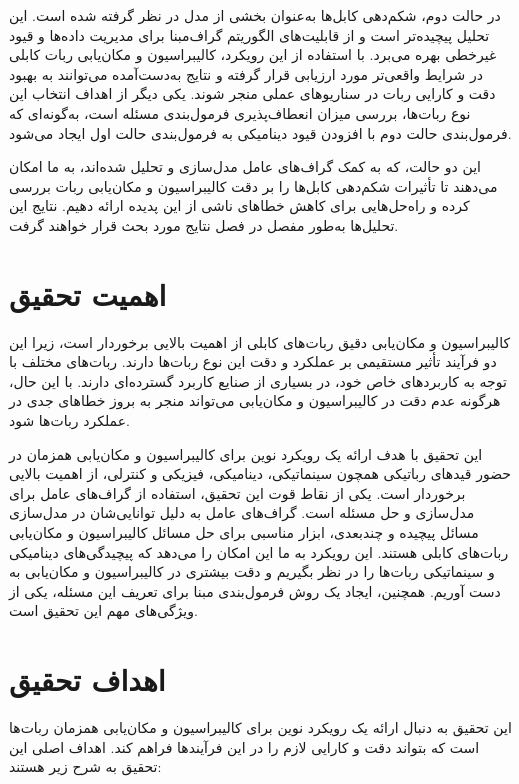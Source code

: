 در حالت دوم، شکم‌دهی کابل‌ها به‌عنوان بخشی از مدل در نظر گرفته شده است. این تحلیل پیچیده‌تر است و از قابلیت‌های الگوریتم گراف‌مبنا برای مدیریت داده‌ها و قیود غیرخطی بهره می‌برد. با استفاده از این رویکرد، کالیبراسیون و مکان‌یابی ربات کابلی در شرایط واقعی‌تر مورد ارزیابی قرار گرفته و نتایج به‌دست‌آمده می‌توانند به بهبود دقت و کارایی ربات در سناریوهای عملی منجر شوند. یکی دیگر از اهداف انتخاب این نوع ربات‌ها، بررسی میزان انعطاف‌پذیری فرمول‌بندی مسئله است، به‌گونه‌ای که فرمول‌بندی حالت دوم با افزودن قیود دینامیکی به فرمول‌بندی حالت اول ایجاد می‌شود.

این دو حالت، که به کمک گراف‌های عامل مدل‌سازی و تحلیل شده‌اند، به ما امکان می‌دهند تا تأثیرات شکم‌دهی کابل‌ها را بر دقت کالیبراسیون و مکان‌یابی ربات بررسی کرده و راه‌حل‌هایی برای کاهش خطاهای ناشی از این پدیده ارائه دهیم. نتایج این تحلیل‌ها به‌طور مفصل در فصل نتایج مورد بحث قرار خواهند گرفت.


\section{اهمیت تحقیق}

کالیبراسیون و مکان‌یابی دقیق ربات‌های کابلی از اهمیت بالایی برخوردار است، زیرا این دو فرآیند تأثیر مستقیمی بر عملکرد و دقت این نوع ربات‌ها دارند. ربات‌های مختلف با توجه به کاربردهای خاص خود، در بسیاری از صنایع کاربرد گسترده‌ای دارند. با این حال، هرگونه عدم دقت در کالیبراسیون و مکان‌یابی می‌تواند منجر به بروز خطاهای جدی در عملکرد ربات‌ها شود.

این تحقیق با هدف ارائه یک رویکرد نوین برای کالیبراسیون و مکان‌یابی همزمان در حضور قیدهای رباتیکی همچون سینماتیکی، دینامیکی، فیزیکی و کنترلی، از اهمیت بالایی برخوردار است. یکی از نقاط قوت این تحقیق، استفاده از گراف‌های عامل برای مدل‌سازی و حل مسئله است. گراف‌های عامل به دلیل توانایی‌شان در مدل‌سازی مسائل پیچیده و چندبعدی، ابزار مناسبی برای حل مسائل کالیبراسیون و مکان‌یابی ربات‌های کابلی هستند. این رویکرد به ما این امکان را می‌دهد که پیچیدگی‌های دینامیکی و سینماتیکی ربات‌ها را در نظر بگیریم و دقت بیشتری در کالیبراسیون و مکان‌یابی به دست آوریم. همچنین، ایجاد یک روش فرمول‌بندی مبنا برای تعریف این مسئله، یکی از ویژگی‌های مهم این تحقیق است. 


\section{اهداف تحقیق}
این تحقیق به دنبال ارائه یک رویکرد نوین برای کالیبراسیون و مکان‌یابی همزمان ربات‌ها است که بتواند دقت و کارایی لازم را در این فرآیندها فراهم کند. اهداف اصلی این تحقیق به شرح زیر هستند:

